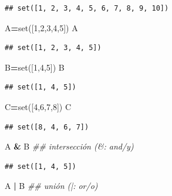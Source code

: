 \documentclass[]{book}
\newenvironment{Shaded}{\begin{snugshade}}{\end{snugshade}}
\newcommand{\BuiltInTok}[1]{#1}
\newcommand{\CommentTok}[1]{\textcolor[rgb]{0.56,0.35,0.01}{\textit{#1}}}
\newcommand{\DecValTok}[1]{\textcolor[rgb]{0.00,0.00,0.81}{#1}}
\newcommand{\NormalTok}[1]{#1}
\newcommand{\OperatorTok}[1]{\textcolor[rgb]{0.81,0.36,0.00}{\textbf{#1}}}
\begin{document}
\begin{verbatim}
## set([1, 2, 3, 4, 5, 6, 7, 8, 9, 10])
\end{verbatim}

\begin{Shaded}
\begin{Highlighting}[]
\NormalTok{A}\OperatorTok{=}\BuiltInTok{set}\NormalTok{([}\DecValTok{1}\NormalTok{,}\DecValTok{2}\NormalTok{,}\DecValTok{3}\NormalTok{,}\DecValTok{4}\NormalTok{,}\DecValTok{5}\NormalTok{])}
\NormalTok{A}
\end{Highlighting}
\end{Shaded}

\begin{verbatim}
## set([1, 2, 3, 4, 5])
\end{verbatim}

\begin{Shaded}
\begin{Highlighting}[]
\NormalTok{B}\OperatorTok{=}\BuiltInTok{set}\NormalTok{([}\DecValTok{1}\NormalTok{,}\DecValTok{4}\NormalTok{,}\DecValTok{5}\NormalTok{])}
\NormalTok{B}
\end{Highlighting}
\end{Shaded}

\begin{verbatim}
## set([1, 4, 5])
\end{verbatim}

\begin{Shaded}
\begin{Highlighting}[]
\NormalTok{C}\OperatorTok{=}\BuiltInTok{set}\NormalTok{([}\DecValTok{4}\NormalTok{,}\DecValTok{6}\NormalTok{,}\DecValTok{7}\NormalTok{,}\DecValTok{8}\NormalTok{])}
\NormalTok{C}
\end{Highlighting}
\end{Shaded}

\begin{verbatim}
## set([8, 4, 6, 7])
\end{verbatim}

\begin{Shaded}
\begin{Highlighting}[]
\NormalTok{A }\OperatorTok{&}\NormalTok{ B   }\CommentTok{## intersección (&: and/y)}
\end{Highlighting}
\end{Shaded}

\begin{verbatim}
## set([1, 4, 5])
\end{verbatim}

\begin{Shaded}
\begin{Highlighting}[]
\NormalTok{A }\OperatorTok{|}\NormalTok{ B   }\CommentTok{## unión (|: or/o)}
\end{Highlighting}
\end{Shaded}
\end{document}
